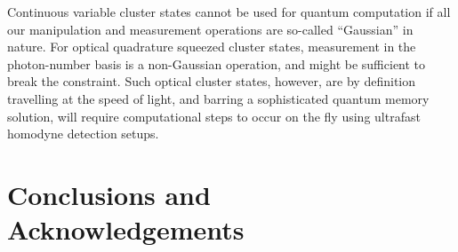 \documentclass[twocolumn]{Styles/IEEEtran11}
\begin{document}
Continuous variable cluster states cannot be used for quantum computation if all our manipulation and measurement operations are so-called ``Gaussian'' in nature. For optical quadrature squeezed cluster states, measurement in the photon-number basis is a non-Gaussian operation, and might be sufficient to break the constraint. Such optical cluster states, however, are by definition travelling at the speed of light, and barring a sophisticated quantum memory solution, will require computational steps to occur on the fly using ultrafast homodyne detection setups.

\section{Conclusions and Acknowledgements}









\end{document}
